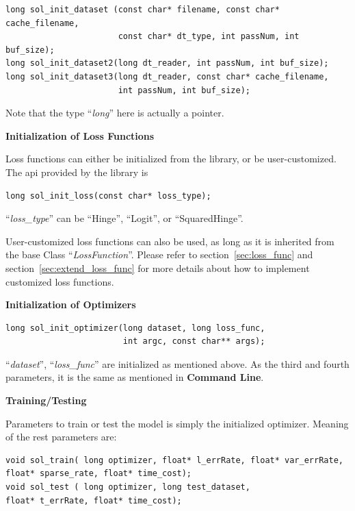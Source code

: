 \documentclass[11pt,a4paper]{article}
\begin{document}
\lstset{language=C++}
\begin{lstlisting}
long sol_init_dataset (const char* filename, const char* cache_filename, 
                       const char* dt_type, int passNum, int buf_size);
long sol_init_dataset2(long dt_reader, int passNum, int buf_size);
long sol_init_dataset3(long dt_reader, const char* cache_filename, 
                       int passNum, int buf_size);
\end{lstlisting}

Note that the type ``\emph{long}'' here is actually  a pointer.

\vspace{4mm}\hspace{-5mm}\textbf{Initialization of Loss Functions}
\vspace{2mm}

Loss functions can either be initialized from the library, or be
user-customized. The api provided by the library is
\lstset{language=C++}
\begin{lstlisting}
long sol_init_loss(const char* loss_type);
\end{lstlisting}
``\emph{loss\_type}'' can be ``Hinge'', ``Logit'', or ``SquaredHinge''.

User-customized loss functions can also be used, as long as it is inherited
from the base Class ``\emph{LossFunction}''. Please refer
to section~\ref{sec:loss_func} and section~\ref{sec:extend_loss_func} for more
details about how to implement customized loss functions.

\vspace{4mm}\hspace{-5mm}\textbf{Initialization of Optimizers}
\vspace{2mm}
\lstset{language=C++}
\begin{lstlisting}
long sol_init_optimizer(long dataset, long loss_func, 
                        int argc, const char** args);
\end{lstlisting}
``\emph{dataset}'', ``\emph{loss\_func}'' are initialized as mentioned above.
As the third and fourth parameters, it is the same as mentioned in
\textbf{Command Line}.

\vspace{4mm}\hspace{-5mm}\textbf{Training/Testing}
\vspace{2mm}

Parameters to train or test the model is simply the initialized optimizer.
Meaning of the rest parameters are:
\lstset{language=C++}
\begin{lstlisting}
void sol_train( long optimizer, float* l_errRate, float* var_errRate, 
float* sparse_rate, float* time_cost);
void sol_test ( long optimizer, long test_dataset,  
float* t_errRate, float* time_cost);
\end{lstlisting}
\end{document}

